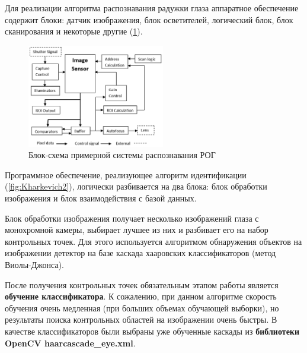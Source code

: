 \documentclass[10pt, a5paper]{article}
\begin{document}
Для реализации алгоритма распознавания радужки глаза аппаратное обеспечение содержит блоки: датчик изображения, блок осветителей, логический блок, блок сканирования и некоторые другие (\ref{fig:Kharkevich1}).

\begin{center}
\begin{figure}[h!]
  \centering
  \includegraphics[width=6cm]{w_09_2018_Kharkevich1.png}
  \caption{Блок-схема примерной системы распознавания РОГ}
  \label{fig:Kharkevich1}
\end{figure}
\end{center} 

Программное обеспечение, реализующее алгоритм идентификации (\ref{fig:Kharkevich2}), логически разбивается на два блока: блок обработки изображения и блок взаимодействия с базой данных.

Блок обработки изображения получает несколько изображений глаза с монохромной камеры, выбирает лучшее из них и разбивает его на набор контрольных точек. Для этого используется алгоритмом обнаружения объектов на изображении   детектор на базе каскада хааровских классификаторов (метод Виолы-Джонса).

После получения контрольных точек обязательным этапом работы является \textbf{обучение классификатора}. К сожалению, при данном алгоритме скорость обучения очень медленная (при больших объемах обучающей выборки), но результаты поиска контрольных областей на изображении очень быстры. В качестве классификаторов были выбраны уже обученные каскады из \textbf{библиотеки OpenCV haarcascade\_eye.xml}.
\end{document}
